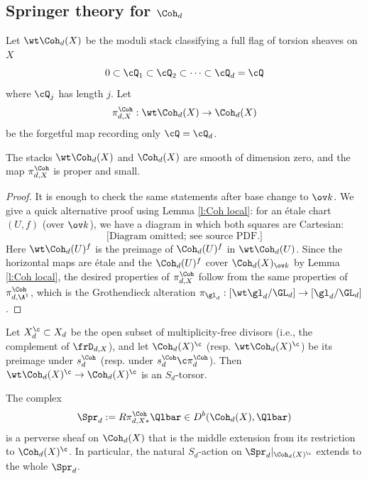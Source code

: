 \subsection{Springer theory for $\Coh_{d}$}
Let $\wt\Coh_{d}(X)$ be the moduli stack classifying a full flag of torsion sheaves  on $X$
\begin{equation*}
0\subset \cQ_{1}\subset \cQ_{2}\subset \cdots\subset \cQ_{d}=\cQ
\end{equation*}
where $\cQ_{j}$ has length $j$. Let
\begin{equation*}
\pi^{\Coh}_{d,X}: \wt\Coh_{d}(X)\to \Coh_{d}(X)
\end{equation*}
be the forgetful map recording only $\cQ=\cQ_{d}$.

\begin{lemma}
\notready\label{lem: Laumon small} The stacks $\wt\Coh_{d}(X)$ and $\Coh_{d}(X)$ are smooth of dimension zero, and the map $\pi^{\Coh}_{d,X}$ is proper and small.
\end{lemma}
\begin{proof} It is enough to check the same statements after base change to $\ov k$. We give a quick alternative proof using Lemma \ref{l:Coh local}: for an \'etale chart $(U,f)$ (over $\ov k$), we have a diagram in which both squares are Cartesian:
\begin{equation*}
\text{[Diagram omitted; see source PDF.]}
\end{equation*}
Here $\wt\Coh_{d}(U)^{f}$ is the preimage of $\Coh_{d}(U)^{f}$ in $\wt\Coh_{d}(U)$. Since the horizontal maps are \'etale and the $\Coh_{d}(U)^{f}$ cover $\Coh_{d}(X)_{\ov k}$ by Lemma \ref{l:Coh local}, the desired properties of $\pi^{\Coh}_{d,X}$ follow from the same properties of $\pi^{\Coh}_{d,\A^{1}}$, which is the Grothendieck alteration $\pi_{\gl_{d}}: [\wt\gl_{d}/\GL_{d}]\to [\gl_{d}/\GL_{d}]$.
\end{proof}

Let $X_{d}^{\c}\subset X_{d}$ be the open subset of multiplicity-free divisors (i.e., the complement of $\frD_{d,X}$), and let $\Coh_{d}(X)^{\c}$ (resp. $\wt\Coh_{d}(X)^{\c}$) be its  preimage under $s^{\Coh}_{d}$ (resp. under $s^{\Coh}_{d}\c\pi_{d}^{\Coh}$). Then $\wt\Coh_{d}(X)^{\c}\to \Coh_{d}(X)^{\c}$ is an $S_{d}$-torsor.

\begin{cor}
\notready\label{c:Coh Spr} The complex
\begin{equation*}
\Spr_{d}:=R\pi^{\Coh}_{d,X*}\Qlbar\in D^{b}(\Coh_{d}(X), \Qlbar)
\end{equation*}
is a perverse sheaf on $\Coh_{d}(X)$ that is the middle extension from its restriction to $\Coh_{d}(X)^{\c}$. In particular, the natural $S_{d}$-action on $\Spr_d|_{\Coh_{d}(X)^{\c}}$ extends to the whole $\Spr_{d}$.
\end{cor}



